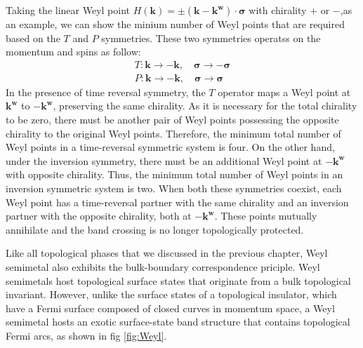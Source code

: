 Taking the linear Weyl point  $H(\mathbf{k}) = \pm(\mathbf{k}-\mathbf{k^w})\cdot\mathbf{\sigma}$ with chirality $+$ or $-$,as an example, we can show the minium number of Weyl points that are required based on the $T$ and $P$ symmetries. These two symmetries operatss on the momentum and spins as follow:
\begin{equation}
\begin{aligned}
    T: \mathbf{k}\rightarrow-\mathbf{k}, \quad\mathbf{\sigma}\rightarrow-\mathbf{\sigma}\\
    P: \mathbf{k}\rightarrow-\mathbf{k}, \quad\mathbf{\sigma}\rightarrow\mathbf{\sigma}
\end{aligned}
\end{equation}
In the presence of time reversal symmetry, the $T$ operator maps a Weyl point at $\mathbf{k^w}$ to $-\mathbf{k^w}$, preserving the same chirality. As it is necessary for the total chirality to be zero, there must be another pair of Weyl points possessing the opposite chirality to the original Weyl points. Therefore, the minimum total number of Weyl points in a time-reversal symmetric system is four. On the other hand, under the inversion symmetry, there must be an additional Weyl point at $-\mathbf{k^w}$ with opposite chirality. Thus, the minimum total number of Weyl points in an inversion symmetric system is two. When both these symmetries coexist, each Weyl point has a time-reversal partner with the same chirality and an inversion partner with the opposite chirality, both at $-\mathbf{k^w}$. These points mutually annihilate and the band crossing is no longer topologically protected.


Like all topological phases that we discussed in the previous chapter, Weyl semimetal also exhibits the bulk-boundary correspondence priciple. Weyl semimetals host topological surface states  that originate from  a bulk topological invariant. However, unlike the surface states of a topological insulator, which have a Fermi surface composed of closed curves in momentum space, a Weyl semimetal hosts an exotic surface-state band structure that contains topological Fermi arcs, as shown in fig \ref{fig:Weyl}.


